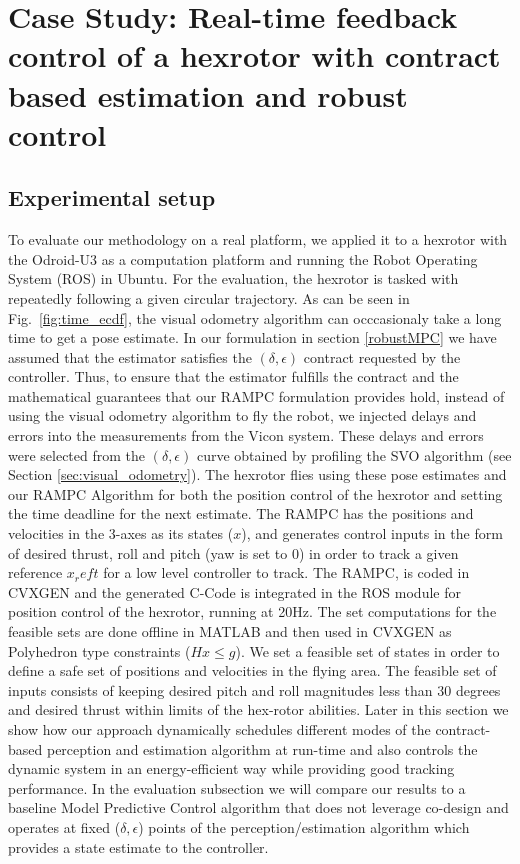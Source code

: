 \section{Case Study: Real-time feedback control of a hexrotor with contract based estimation and robust control}
\label{sec:experiments}

\subsection{Experimental setup}
To evaluate our methodology on a real platform, we applied it to a hexrotor with the Odroid-U3 as a computation platform and running the Robot Operating System (ROS) in Ubuntu. For the evaluation, the hexrotor is tasked with repeatedly following a given circular trajectory.
As can be seen in Fig.~\ref{fig:time_ecdf}, the visual odometry algorithm can occcasionaly take a long time to get a pose estimate. In our formulation in section \ref{robustMPC} we have assumed that the estimator satisfies the $(\delta, \epsilon)$ contract requested by the controller. Thus, to ensure that the estimator fulfills the contract and the mathematical guarantees that our RAMPC formulation provides hold, instead of using the visual odometry algorithm to fly the robot, we injected delays and errors into the measurements from the Vicon system. These delays and errors were selected from the $(\delta,\epsilon)$ curve obtained by profiling the SVO algorithm (see Section \ref{sec:visual_odometry}).
The hexrotor flies using these pose estimates and our RAMPC Algorithm for both the position control of the hexrotor and setting the time deadline for the next estimate. The RAMPC has the positions and velocities in the 3-axes as its states ($x$), and generates control inputs in the form of desired thrust, roll and pitch (yaw is set to 0) in order to track a given reference $x_ref{t}$ for a low level controller to track. The RAMPC, is coded in CVXGEN \cite{cvxgen} and the generated C-Code is integrated in the ROS module for position control of the hexrotor, running at 20Hz. The set computations for the feasible sets are done offline in MATLAB and then used in CVXGEN as Polyhedron type constraints ($Hx \le g$). We set a feasible set of states in order to define a safe set of positions and velocities in the flying area. The feasible set of inputs consists of keeping desired pitch and roll magnitudes less than $30$ degrees and desired thrust within limits of the hex-rotor abilities.
Later in this section we show how our approach dynamically schedules different modes of the contract-based perception and estimation algorithm at run-time and also controls the dynamic system in an energy-efficient way while providing good tracking performance. In the evaluation subsection we will compare our results to a baseline Model Predictive Control algorithm that does not leverage co-design and operates at fixed ($\delta,\epsilon$) points of the perception/estimation algorithm which provides a state estimate to the controller.

